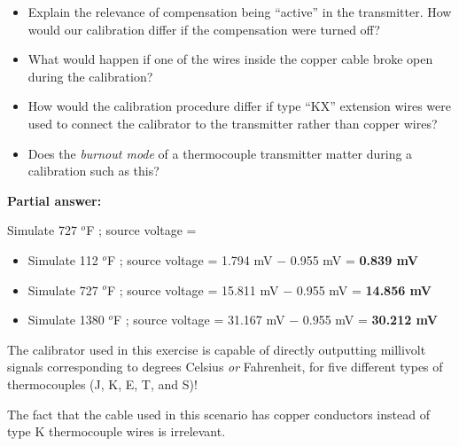 \begin{itemize}
\item{} Explain the relevance of compensation being ``active'' in the transmitter.  How would our calibration differ if the compensation were turned off?
\item{} What would happen if one of the wires inside the copper cable broke open during the calibration?
\item{} How would the calibration procedure differ if type ``KX'' extension wires were used to connect the calibrator to the transmitter rather than copper wires?
\item{} Does the {\it burnout mode} of a thermocouple transmitter matter during a calibration such as this?
\end{itemize}







\noindent
{\bf Partial answer:}

\vskip 10pt

Simulate 727 $^{o}$F ; source voltage = 







\begin{itemize}
\item{} Simulate 112 $^{o}$F ; source voltage = 1.794 mV $-$ 0.955 mV = {\bf 0.839 mV}
\vskip 10pt
\item{} Simulate 727 $^{o}$F ; source voltage = 15.811 mV $-$ 0.955 mV = {\bf 14.856 mV}
\vskip 10pt
\item{} Simulate 1380 $^{o}$F ; source voltage = 31.167 mV $-$ 0.955 mV = {\bf 30.212 mV}
\end{itemize}

\vskip 10pt

The calibrator used in this exercise is capable of directly outputting millivolt signals corresponding to degrees Celsius {\it or} Fahrenheit, for five different types of thermocouples (J, K, E, T, and S)!

\vskip 10pt

The fact that the cable used in this scenario has copper conductors instead of type K thermocouple wires is irrelevant.  





